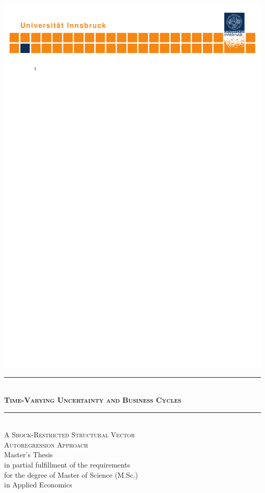 \documentclass[a4paper,11pt,listof=nochaptergap,oneside,pointednumbers,bibtotoc,bigheadings,liststotoc]{scrbook}
\theoremstyle{mysatz}
\theoremstyle{mydefinition}
\theoremstyle{mytheorem}
\theoremstyle{mybemerkung}
\begin{document}
\begin{titlepage}
    \begin{center}
        \hspace*{-0.27\textwidth}\includegraphics[width=1.419\textwidth, trim = 5mm 250mm 0mm 0mm, clip = TRUE]{logo.pdf}\hspace*{-0.3\textwidth}
        \quad \\[0mm]
        \newcommand{\HRule}{\rule{\linewidth}{0.3mm}} %
        \HRule \\[-1mm]
        \Huge{\scshape\bfseries Time-Varying Uncertainty and Business Cycles} \\[-5mm]
        \HRule \\[2mm]
        \Large {\scshape A Shock-Restricted Structural Vector \\
        				Autoregression Approach} \\[10mm]
        \Large Master's Thesis \\[10mm]
        \Large in partial fulfillment of the requirements \\for the degree of Master of Science (M.Sc.)\\
                  in Applied Economics \\[10mm]
                  

\end{center}
\end{titlepage}
\end{document}

